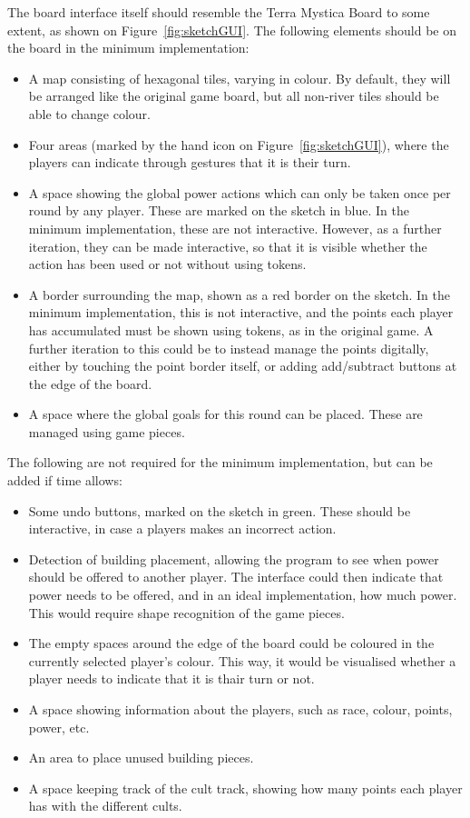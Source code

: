 The board interface itself should resemble the Terra Mystica Board to some extent, as shown on Figure~\ref{fig:sketchGUI}. The following elements should be on the board in the minimum implementation:
\begin{itemize}
\item A map consisting of hexagonal tiles, varying in colour. By default, they will be arranged like the original game board, but all non-river tiles should be able to change colour.
\item Four areas (marked by the hand icon on Figure~\ref{fig:sketchGUI}), where the players can indicate through gestures that it is their turn.
\item A space showing the global power actions which can only be taken once per round by any player. These are marked on the sketch in blue. In the minimum implementation, these are not interactive. However, as a further iteration, they can be made interactive, so that it is visible whether the action has been used or not without using tokens.
\item A border surrounding the map, shown as a red border on the sketch. In the minimum implementation, this is not interactive, and the points each player has accumulated must be shown using tokens, as in the original game. A further iteration to this could be to instead manage the points digitally, either by touching the point border itself, or adding add/subtract buttons at the edge of the board.
\item A space where the global goals for this round can be placed. These are managed using game pieces.
\end{itemize}

The following are not required for the minimum implementation, but can be added if time allows:
\begin{itemize}
\item Some undo buttons, marked on the sketch in green. These should be interactive, in case a players makes an incorrect action.
\item Detection of building placement, allowing the program to see when power should be offered to another player. The interface could then indicate that power needs to be offered, and in an ideal implementation, how much power. This would require shape recognition of the game pieces.
\item The empty spaces around the edge of the board could be coloured in the currently selected player's colour. This way, it would be visualised whether a player needs to indicate that it is thair turn or not.
\item A space showing information about the players, such as race, colour, points, power, etc.
\item An area to place unused building pieces.
\item A space keeping track of the cult track, showing how many points each player has with the different cults.
\end{itemize}

